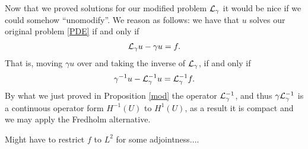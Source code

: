 \documentclass[12pt]{article}
\newcommand{\red}[1]{{\color{red}#1}}
\begin{document}
Now that we proved solutions for our modified problem $\mathcal{L}_\gamma $ it would be nice if we could somehow ``unomodify''. We reason as follows: we have that $u$ solves our original problem  \eqref{PDE} if and only if
\begin{align*}
	\mathcal{L}_\gamma u - \gamma  u =f.
\end{align*}
That is, moving $\gamma  u$ over and taking the inverse of $\mathcal{L}_\gamma $, if and only if
\begin{align*}
	\gamma^{-1}u -\mathcal{L}_\gamma ^{-1} u = \mathcal{L}_\gamma ^{-1}f.
\end{align*}
By what we just proved in Proposition \ref{mod} the operator $\mathcal{L}_\gamma^{-1}$, and thus $ \gamma \mathcal{L}_\gamma ^{-1}$ is a continuous operator form $H^{-1}(U)$ to  $H^{1}(U)$, as a result it is compact and we may apply the Fredholm alternative.

\red{Might have to restrict $f$ to  $L^2$ for some adjointness....}

\appendix



\end{document}
